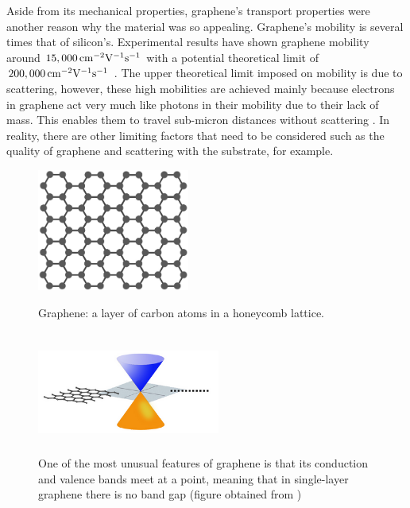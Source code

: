 \noindent Aside from its mechanical properties, graphene's transport properties were another reason why the material was so appealing. Graphene's mobility is several times that of silicon's. Experimental results have shown graphene mobility around $15,000\,\mathrm{cm}^{-2}\mathrm{V}^{-1}\mathrm{s}^{-1}$ with a potential theoretical limit of $200,000\,\mathrm{cm}^{-2}\mathrm{V}^{-1}\mathrm{s}^{-1}$ \cite{Dargys_Encylco1994,Akinwande_NatureComm2014}. The upper theoretical limit imposed on mobility is due to scattering, however, these high mobilities are achieved mainly because electrons in graphene act very much like photons in their mobility due to their lack of mass. This enables them to travel sub-micron distances without scattering \cite{Novoselov_NatureMat2007}. In reality, there are other limiting factors that need to be considered such as the quality of graphene and scattering with the substrate, for example. \\

\begin{figure}[ht]
	\centering
	\begin{minipage}[b]{0.45\linewidth}
		\includegraphics[height=4cm,width=5cm]{figs/intro/graphene_honeycomb}
		\caption[Graphene honeycomb lattice]{Graphene: a layer of carbon atoms in a honeycomb lattice.}
		\label{fig:graphene_honeycomb}
	\end{minipage}
	\qquad
	\begin{minipage}[b]{0.45\linewidth}
		\includegraphics[height=4cm,width=6cm]{figs/intro/graphene_bandgap}
		\caption[Bandgap of graphene]{One of the most unusual features of graphene is that its conduction and valence bands meet at a point, meaning that in single-layer graphene there is no band gap (figure obtained from \cite{Berkley_Online2009})}
		\label{fig:graphene_bandgap}
	\end{minipage}
\end{figure}

